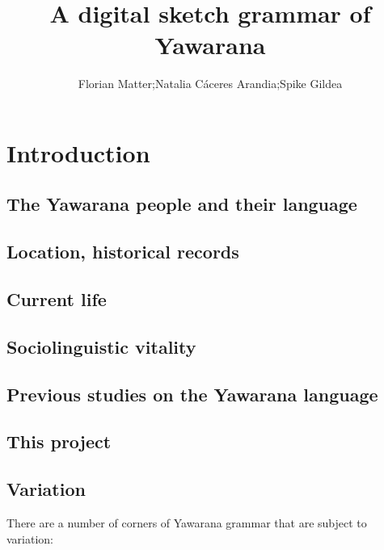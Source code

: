 \documentclass{memoir}
\title{A digital sketch grammar of Yawarana}
\author{Florian Matter;Natalia Cáceres Arandia;Spike Gildea}
\begin{document}


\tableofcontents

\chapter{\texorpdfstring{Introduction \label{intro}}{Introduction }}

\section{\texorpdfstring{The Yawarana people and their language
\label{sec:people}}{The Yawarana people and their language }}

\section{\texorpdfstring{Location, historical records
\label{sec:context}}{Location, historical records }}

\section{\texorpdfstring{Current life
\label{sec:currentlife}}{Current life }}

\section{\texorpdfstring{Sociolinguistic vitality
\label{sec:vitality}}{Sociolinguistic vitality }}

\section{\texorpdfstring{Previous studies on the Yawarana language
\label{sec:previous}}{Previous studies on the Yawarana language }}

\section{\texorpdfstring{This project
\label{sec:thisproject}}{This project }}

\section{\texorpdfstring{Variation \label{sec:variation}}{Variation }}

There are a number of corners of Yawarana grammar that are subject to
variation:
\end{document}
